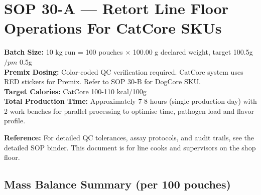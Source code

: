 
\section*{SOP 30-A --- Retort Line Floor Operations For CatCore SKUs}
\label{sop:retort_line}

\textbf{Batch Size:} 10 kg run = 100 pouches $\times$ 100.00 g declared weight, target 100.5g $/pm$ 0.5g \\
\textbf{Premix Dosing:} Color-coded QC verification required. CatCore system uses RED stickers for Premix. Refer to SOP 30-B for DogCore SKU.\\
\textbf{Target Calories:} CatCore 100-110 kcal/100g \\
\textbf{Total Production Time:} Approximately 7-8 hours (single production day) with 2 work benches for parallel processing to optimise time, pathogen load and flavor profile. 

\vspace{1em}
\noindent\textbf{Reference:} For detailed QC tolerances, assay protocols, and audit trails, see the detailed SOP binder. This document is for line cooks and supervisors on the shop floor.

\vspace{1em}


\subsection*{Mass Balance Summary (per 100 pouches)}

